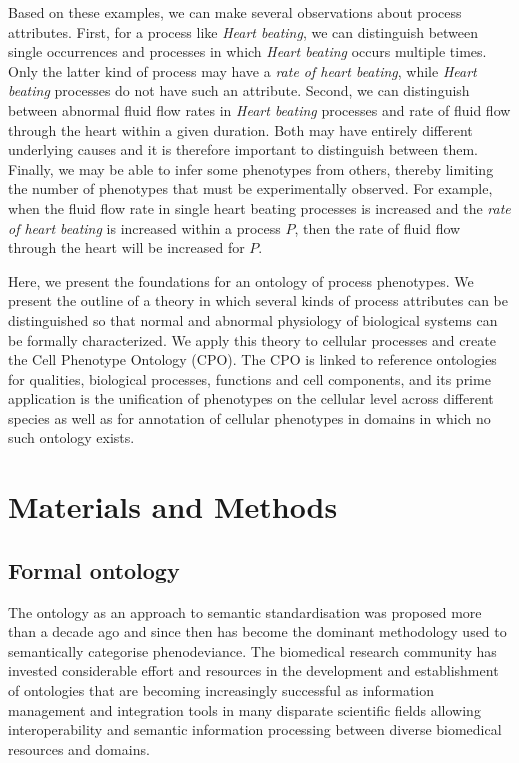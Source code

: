 \documentclass[12pt]{article}
\begin{document}
Based on these examples, we can make several observations about
process attributes. First, for a process like {\em Heart beating}, we
can distinguish between single occurrences and processes in which {\em
  Heart beating} occurs multiple times. Only the latter kind of
process may have a {\em rate of heart beating}, while {\em Heart
  beating} processes do not have such an attribute. Second, we can
distinguish between abnormal fluid flow rates in {\em Heart beating}
processes and rate of fluid flow through the heart within a given
duration. Both may have entirely different underlying causes and it is
therefore important to distinguish between them. Finally, we may be
able to infer some phenotypes from others, thereby limiting the number
of phenotypes that must be experimentally observed. For example, when
the fluid flow rate in single heart beating processes is increased and
the {\em rate of heart beating} is increased within a process $P$,
then the rate of fluid flow through the heart will be increased for
$P$.

Here, we present the foundations for an ontology of process
phenotypes. We present the outline of a theory in which several kinds
of process attributes can be distinguished so that normal and abnormal
physiology of biological systems can be formally characterized. We
apply this theory to cellular processes and create the Cell Phenotype
Ontology (CPO). The CPO is linked to reference ontologies for
qualities, biological processes, functions and cell components, and
its prime application is the unification of phenotypes on the cellular
level across different species as well as for annotation of cellular
phenotypes in domains in which no such ontology exists.

\section{Materials and Methods}
\subsection{Formal ontology}
The ontology as an approach to semantic standardisation was proposed
more than a decade ago and since then has become the dominant
methodology used to semantically categorise phenodeviance.  The
biomedical research community has invested considerable effort and
resources in the development and establishment of ontologies that are
becoming increasingly successful as information management and
integration tools in many disparate scientific fields allowing
interoperability and semantic information processing between diverse
biomedical resources and domains.
\end{document}
